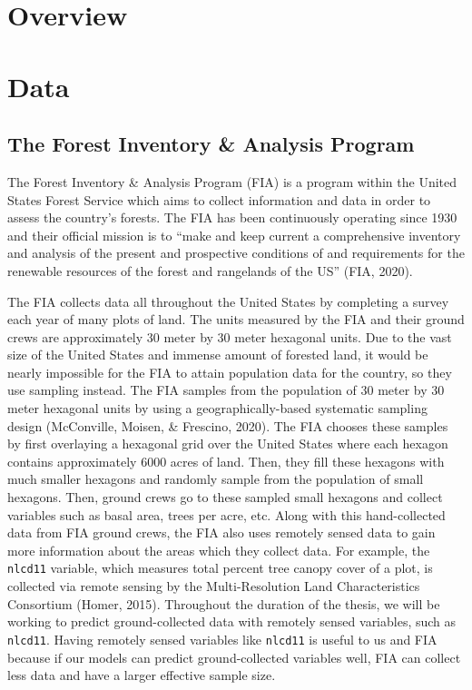 \documentclass[12pt,twoside]{reedthesis}
\begin{document}
\hypertarget{overview}{%
\chapter{Overview}\label{overview}}

\hypertarget{data}{%
\chapter{Data}\label{data}}

\hypertarget{the-forest-inventory-analysis-program}{%
\section{The Forest Inventory \& Analysis Program}\label{the-forest-inventory-analysis-program}}

The Forest Inventory \& Analysis Program (FIA) is a program within the United States Forest Service which aims to collect information and data in order to assess the country's forests. The FIA has been continuously operating since 1930 and their official mission is to ``make and keep current a comprehensive inventory and analysis of the present and prospective conditions of and requirements for the renewable resources of the forest and rangelands of the US'' (FIA, 2020).

The FIA collects data all throughout the United States by completing a survey each year of many plots of land. The units measured by the FIA and their ground crews are approximately 30 meter by 30 meter hexagonal units. Due to the vast size of the United States and immense amount of forested land, it would be nearly impossible for the FIA to attain population data for the country, so they use sampling instead. The FIA samples from the population of 30 meter by 30 meter hexagonal units by using a geographically-based systematic sampling design (McConville, Moisen, \& Frescino, 2020). The FIA chooses these samples by first overlaying a hexagonal grid over the United States where each hexagon contains approximately 6000 acres of land. Then, they fill these hexagons with much smaller hexagons and randomly sample from the population of small hexagons. Then, ground crews go to these sampled small hexagons and collect variables such as basal area, trees per acre, etc. Along with this hand-collected data from FIA ground crews, the FIA also uses remotely sensed data to gain more information about the areas which they collect data. For example, the \texttt{nlcd11} variable, which measures total percent tree canopy cover of a plot, is collected via remote sensing by the Multi-Resolution Land Characteristics Consortium (Homer, 2015). Throughout the duration of the thesis, we will be working to predict ground-collected data with remotely sensed variables, such as \texttt{nlcd11}. Having remotely sensed variables like \texttt{nlcd11} is useful to us and FIA because if our models can predict ground-collected variables well, FIA can collect less data and have a larger effective sample size.
\end{document}
